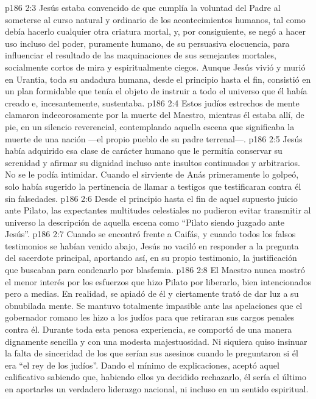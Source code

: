 \vs p186 2:3 Jesús estaba convencido de que cumplía la voluntad del Padre al someterse al curso natural y ordinario de los acontecimientos humanos, tal como debía hacerlo cualquier otra criatura mortal, y, por consiguiente, se negó a hacer uso incluso del poder, puramente humano, de su persuasiva elocuencia, para influenciar el resultado de las maquinaciones de sus semejantes mortales, socialmente cortos de mira y espiritualmente ciegos. Aunque Jesús vivió y murió en Urantia, toda su andadura humana, desde el principio hasta el fin, consistió en un plan formidable que tenía el objeto de instruir a todo el universo que él había creado e, incesantemente, sustentaba.
\vs p186 2:4 \pc Estos judíos estrechos de mente clamaron indecorosamente por la muerte del Maestro, mientras él estaba allí, de pie, en un silencio reverencial, contemplando aquella escena que significaba la muerte de una nación ---el propio pueblo de su padre terrenal---.
\vs p186 2:5 \pc Jesús había adquirido esa clase de carácter humano que le permitía conservar su serenidad y afirmar su dignidad incluso ante insultos continuados y arbitrarios. No se le podía intimidar. Cuando el sirviente de Anás primeramente lo golpeó, solo había sugerido la pertinencia de llamar a testigos que testificaran contra él sin falsedades.
\vs p186 2:6 Desde el principio hasta el fin de aquel supuesto juicio ante Pilato, las expectantes multitudes celestiales no pudieron evitar transmitir al universo la descripción de aquella escena como “Pilato siendo juzgado ante Jesús”.
\vs p186 2:7 Cuando se encontró frente a Caifás, y cuando todos los falsos testimonios se habían venido abajo, Jesús no vaciló en responder a la pregunta del sacerdote principal, aportando así, en su propio testimonio, la justificación que buscaban para condenarlo por blasfemia.
\vs p186 2:8 El Maestro nunca mostró el menor interés por los esfuerzos que hizo Pilato por liberarlo, bien intencionados pero a medias. En realidad, se apiadó de él y ciertamente trató de dar luz a su obnubilada mente. Se mantuvo totalmente impasible ante las apelaciones que el gobernador romano les hizo a los judíos para que retiraran sus cargos penales contra él. Durante toda esta penosa experiencia, se comportó de una manera dignamente sencilla y con una modesta majestuosidad. Ni siquiera quiso insinuar la falta de sinceridad de los que serían sus asesinos cuando le preguntaron si él era “el rey de los judíos”. Dando el mínimo de explicaciones, aceptó aquel calificativo sabiendo que, habiendo ellos ya decidido rechazarlo, él sería el último en aportarles un verdadero liderazgo nacional, ni incluso en un sentido espiritual.
